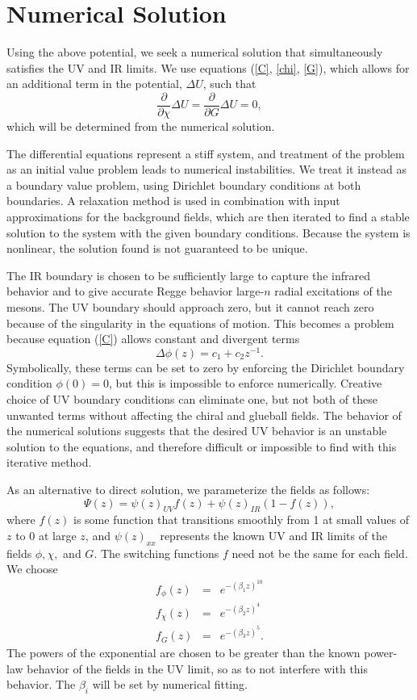 \documentclass[12pt]{article}
\newcommand{\be}{\begin{equation}}
\newcommand{\ee}{\end{equation}}
\newcommand{\ba}{\begin{eqnarray}}
\newcommand{\ea}{\end{eqnarray}}
\begin{document}
\section{Numerical Solution}

Using the above potential, we seek a numerical solution that simultaneously satisfies the UV and IR limits. 
We use equations (\ref{C}, \ref{chi}, \ref{G}), which allows for an additional term in the potential, $\Delta U$, such that 
\be
\frac{\partial }{\partial \chi} \Delta U = \frac{\partial }{\partial G}\Delta U = 0,
\ee
which will be determined from the numerical solution.

The differential equations represent a stiff system, and treatment of the problem as an initial value problem leads to numerical instabilities. 
We treat it instead as a boundary value problem, using Dirichlet boundary conditions at both boundaries. 
A relaxation method is used in combination with input approximations for the background fields, which are then iterated to find a stable solution to the system with the given boundary conditions. 
Because the system is nonlinear, the solution found is not guaranteed to be unique.

The IR boundary is chosen to be sufficiently large to capture the infrared behavior and to give accurate Regge behavior large-$n$ radial excitations of the mesons. 
The UV boundary should approach zero, but it cannot reach zero because of the singularity in the equations of motion. 
This becomes a problem because equation (\ref{C}) allows constant and divergent terms 
\be
\Delta \phi(z) = c_1 + c_2 z^{-1}.
\ee
Symbolically, these terms can be set to zero by enforcing the Dirichlet boundary condition $\phi(0)=0$, but this is impossible to enforce numerically. 
Creative choice of UV boundary conditions can eliminate one, but not both of these unwanted terms without affecting the chiral and glueball fields. 
The behavior of the numerical solutions suggests that the desired UV behavior is an unstable solution to the equations, and therefore difficult or impossible to find with this iterative method.

As an alternative to direct solution, we parameterize the fields as follows:
\be
\Psi(z) = \psi(z)_{UV} f(z) + \psi(z)_{IR} \left(1-f(z)\right),
\ee
where $f(z)$ is some function that transitions smoothly from 1 at small values of $z$ to 0 at large $z$, and $\psi(z)_{xx}$ represents the known UV and IR limits of the fields $\phi, \chi,$ and $G$. 
The switching functions $f$ need not be the same for each field. We choose 
\ba
f_\phi(z)&=&e^{-(\beta_1z)^{10}}\\ \label{param1}
f_\chi(z)&=&e^{-(\beta_2z)^4}\\  \label{param2}
f_G(z)&=&e^{-(\beta_3z)^5}. \label{param3}
\ea
The powers of the exponential are chosen to be greater than the known power-law behavior of the fields in the UV limit, so as to not interfere with this behavior. 
The $\beta_i$ will be set by numerical fitting.
\end{document}
